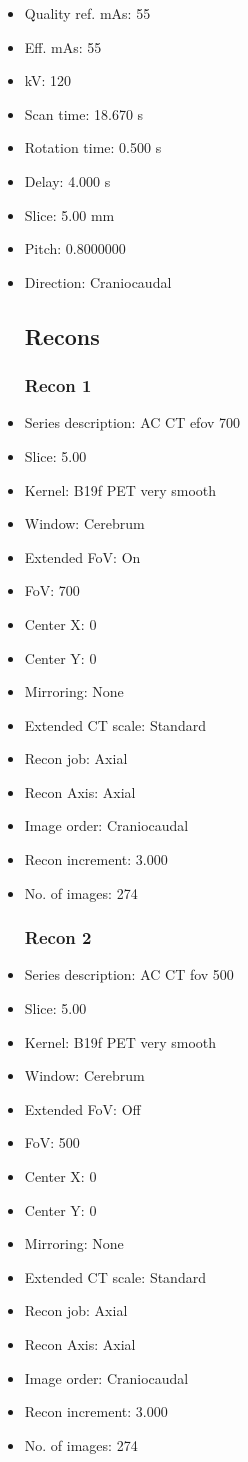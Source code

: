 \documentclass[12pt]{article}
\begin{document}
\begin{itemize}[noitemsep]
\subsection{Scan}
\item Quality ref. mAs: 55\item Eff. mAs: 55\item kV: 120\item Scan time: 18.670 s\item Rotation time: 0.500 s\item Delay: 4.000 s\item Slice: 5.00 mm\item Pitch: 0.8000000\item Direction: Craniocaudal\subsection{Recons}

\subsubsection{Recon 1}
\item Series description: AC CT efov 700
\item Slice: 5.00
\item Kernel: B19f PET very smooth
\item Window: Cerebrum
\item Extended FoV: On
\item FoV: 700
\item Center X: 0
\item Center Y: 0
\item Mirroring: None
\item Extended CT scale: Standard
\item Recon job: Axial
\item Recon Axis: Axial
\item Image order: Craniocaudal
\item Recon increment: 3.000
\item No. of images: 274
\subsubsection{Recon 2}
\item Series description: AC CT fov 500
\item Slice: 5.00
\item Kernel: B19f PET very smooth
\item Window: Cerebrum
\item Extended FoV: Off
\item FoV: 500
\item Center X: 0
\item Center Y: 0
\item Mirroring: None
\item Extended CT scale: Standard
\item Recon job: Axial
\item Recon Axis: Axial
\item Image order: Craniocaudal
\item Recon increment: 3.000
\item No. of images: 274

\end{itemize}
\end{document}
